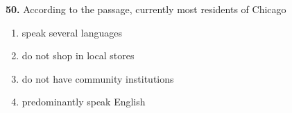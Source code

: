 \documentclass[12pt]{article}
\begin{document}
\par
\vspace{0.25\baselineskip}
\noindent\textbf{50.} According to the passage, currently most residents of Chicago
\begin{enumerate}[label=(\Alph*),leftmargin=*,itemsep=0.2em]
\item speak several languages
\item do not shop in local stores
\item do not have community institutions
\item predominantly speak English
\end{enumerate}
\par
\vspace{0.25\baselineskip}
\end{document}
